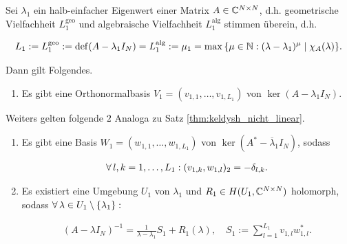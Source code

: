 \begin{proposition} \label{prop:keldysh_linear}

    Sei $\lambda_1$ ein halb-einfacher Eigenwert einer Matrix $A \in \mathbb{C}^{N \times N}$, d.h. geometrische Vielfachheit $L_1^\mathrm{geo}$ und algebraische Vielfachheit $L_1^\mathrm{alg}$ stimmen überein, d.h.

    \begin{align*}
        L_1
        :=
        L_1^\mathrm{geo} := \operatorname{def}(A - \lambda_1 I_N)
        =
        L_1^\mathrm{alg} := \mu_1 = \max {\left \{ \mu \in \mathbb{N}: (\lambda - \lambda_1)^\mu \mid \chi_A(\lambda) \right \}}.
    \end{align*}

    Dann gilt Folgendes.

    \begin{enumerate}[label = (\roman*)]
        \item Es gibt eine Orthonormalbasis $V_1 = (v_{1, 1}, \dots, v_{1, L_1})$ von $\ker (A - \lambda_1 I_N)$.
    \end{enumerate}

    Weiters gelten folgende $2$ Analoga zu Satz \ref{thm:keldysh_nicht_linear}.

    \begin{enumerate}[label = (\roman*), start = 2]

        \item Es gibt eine Basis $W_1 = (w_{1, 1}, \dots, w_{1, L_1})$ von $\ker (A^\ast - \overline \lambda_1 I_N)$, sodass

        \begin{align*}
            \forall \, l, k = 1, \dots, L_1:
            (v_{1, k}, w_{1, l})_2 = -\delta_{l, k}.
        \end{align*}

        \item Es existiert eine Umgebung $U_1$ von $\lambda_1$ und $R_1 \in H(U_1, \mathbb{C}^{N \times N})$ holomorph, sodass $\forall \, \lambda \in U_1 \setminus {\left \{ \lambda_1 \right \}}:$

        \begin{align*}
            (A - \lambda I_N)^{-1}
            =
            \frac{1}{\lambda - \lambda_1} S_1
            +
            R_1(\lambda),
            \quad
            S_1
            :=
            \sum_{l=1}^{L_1}
                v_{1, l} w_{1, l}^\ast.
        \end{align*}

    \end{enumerate}

\end{proposition}
